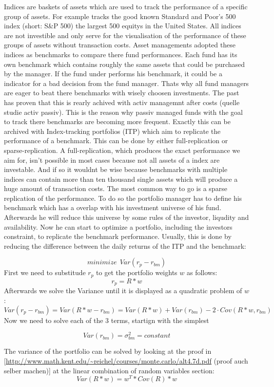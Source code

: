 \documentclass[
  oneside]{book}
\begin{document}
Indices are baskets of assets which are used to track the performance of a specific group of assets. For example tracks the good known Standard and Poor's 500 index (short: S\&P 500) the largest 500 equitys in the United States. All indices are not investible and only serve for the visualisation of the performance of these groups of assets without transaction costs. Asset managements adopted these indices as benchmarks to compare there fund performances. Each fund has its own benchmark which contains roughly the same assets that could be purchased by the manager. If the fund under performs his benchmark, it could be a indicator for a bad decision from the fund manager. Thats why all fund managers are eager to beat there benchmarks with wisely choosen investments. The past has proven that this is rearly achived with activ managemnt after costs (quelle studie activ passiv). This is the reason why passiv managed funds with the goal to track there benchmarks are becoming more frequent. Exactly this can be archived with Index-tracking portfolios (ITP) which aim to replicate the performance of a benchmark. This can be done by either full-replication or sparse-replication. A full-replication, which produces the exact performance we aim for, isn't possible in most cases because not all assets of a index are investable. And if so it wouldnt be wise because benchmarks with multiple indices can contain more than ten thousand single assets which will produce a huge amount of transaction costs. The most common way to go is a sparse replication of the performance. To do so the portfolio manager has to define his benchmark which has a overlap with his investment universe of his fund. Afterwards he will reduce this universe by some rules of the investor, liqudity and availability. Now he can start to optimize a portfolio, including the investors constraint, to replicate the benchmark performance. Usually, this is done by reducing the difference between the daily returns of the ITP and the benchmark:

\[
 minimize \ \ Var(r_{p}-r_{bm})
\]
First we need to substitude \(r_{p}\) to get the portfolio weights \(w\) as follows:
\[
  r_{p} = R * w
\]
Afterwards we solve the Variance until it is displayed as a quadratic problem of \(w\):
\[
 Var(r_{p}-r_{bm}) = Var(R * w - r_{bm}) = Var(R * w) + Var(r_{bm}) - 2 \cdot Cov(R*w,r_{bm}) 
\]
Now we need to solve each of the 3 terms, startign with the simplest

\[
Var(r_{bm}) = \sigma_{bm}^2 = constant
\]

The variance of the portfolio can be solved by looking at the proof in {[}\url{http://www.math.kent.edu/~reichel/courses/monte.carlo/alt4.7d.pdf} (proof auch selber machen){]} at the linear combination of random variables section:
\[
Var(R * w) = w^T * Cov(R) * w
\]
\end{document}
